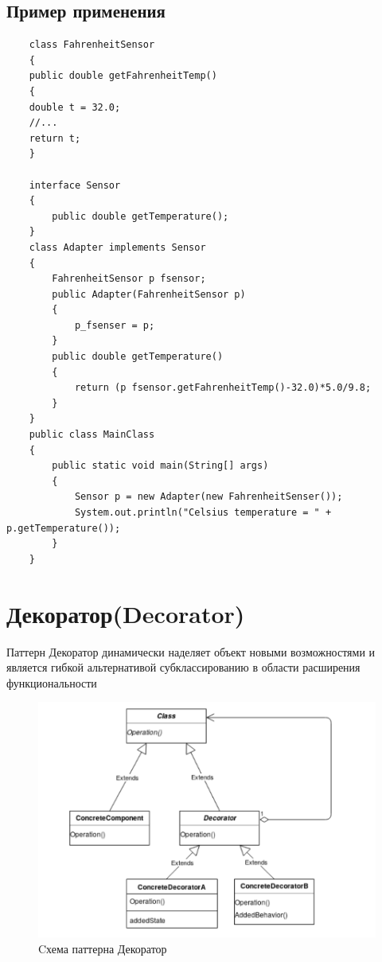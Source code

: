 \newpage
\subsection{Пример применения}
\begin{lstlisting}
    class FahrenheitSensor
    {
    public double getFahrenheitTemp()
    {
    double t = 32.0;
    //...
    return t;
    }
    
    interface Sensor
    {
        public double getTemperature();
    }
    class Adapter implements Sensor
    {
        FahrenheitSensor p fsensor;
        public Adapter(FahrenheitSensor p)
        {
            p_fsenser = p;
        }
        public double getTemperature()
        {
            return (p fsensor.getFahrenheitTemp()-32.0)*5.0/9.8;
        }
    }
    public class MainClass
    {
        public static void main(String[] args)
        {
            Sensor p = new Adapter(new FahrenheitSenser());
            System.out.println("Celsius temperature = " + p.getTemperature());
        }
    }
\end{lstlisting}

\section{Декоратор(Decorator)}

Паттерн Декоратор динамически наделяет объект новыми возможностями и является гибкой альтернативой субклассированию в области расширения функциональности
\begin{figure}[!ht]
\begin{center}
\includegraphics[scale=0.7]{images/pic/pic27-2.png}\caption{Cхема паттерна Декоратор}\label{figure1}
\end{center}
\end{figure}
